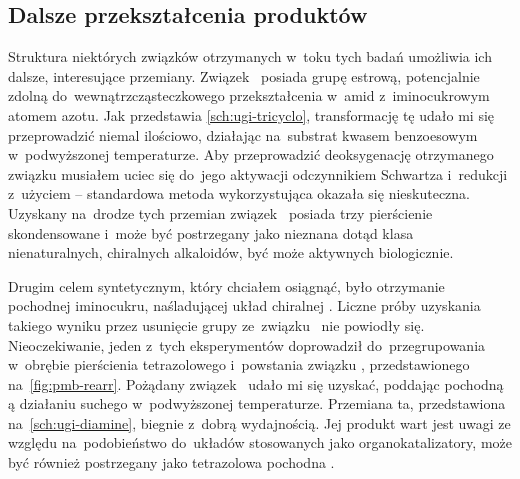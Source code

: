 \subsection{Dalsze przekształcenia produktów}
Struktura niektórych związków otrzymanych w~toku tych badań umożliwia ich dalsze,
  interesujące przemiany.
Związek~ posiada grupę estrową, potencjalnie zdolną do~wewnątrzcząsteczkowego
  przekształcenia w~amid z~iminocukrowym atomem azotu.
Jak przedstawia \cref{sch:ugi-tricyclo}, transformację tę udało mi się przeprowadzić niemal
  ilościowo, działając na~substrat kwasem benzoesowym w~podwyższonej temperaturze.
Aby przeprowadzić deoksygenację otrzymanego związku musiałem
  uciec się do~jego aktywacji odczynnikiem Schwartza i~redukcji z~użyciem  \---
  standardowa metoda wykorzystująca  okazała się nieskuteczna.
Uzyskany na~drodze tych przemian związek~ posiada trzy pierścienie
  skondensowane i~może być postrzegany jako nieznana dotąd klasa nienaturalnych, chiralnych
  alkaloidów, być może aktywnych biologicznie.

\begin{scheme*}
  
  \caption{%
    Synteza nowej klasy alkaloidu  z~iminocukru ,
      otrzymanego przy użyciu opracowanej przeze mnie metodologii.
  }
  \label{sch:ugi-tricyclo}
\end{scheme*}

\begin{marginfigure}[3\baselineskip]
  
  \caption{%
    Produkt przegrupowania związku  następującego pod wpływem \gls{tfa}.
  }
  \label{fig:pmb-rearr}
\end{marginfigure}

Drugim celem syntetycznym, który chciałem osiągnąć, było otrzymanie 
  pochodnej iminocukru, naśladującej układ chiralnej .
Liczne próby uzyskania takiego wyniku przez usunięcie grupy 
  ze~związku~ nie powiodły się.
Nieoczekiwanie, jeden z~tych eksperymentów doprowadził do~przegrupowania w~obrębie pierścienia
  tetrazolowego i~powstania związku ,
  przedstawionego na~\cref{fig:pmb-rearr}.
Pożądany związek~ udało mi się uzyskać, poddając pochodną
  ą  działaniu suchego  w~podwyższonej
  temperaturze.
Przemiana ta, przedstawiona na~\cref{sch:ugi-diamine}, biegnie z~dobrą wydajnością.
Jej produkt wart jest uwagi ze względu na~podobieństwo do~układów stosowanych jako
  organokatalizatory,
  może być również postrzegany jako tetrazolowa pochodna .

